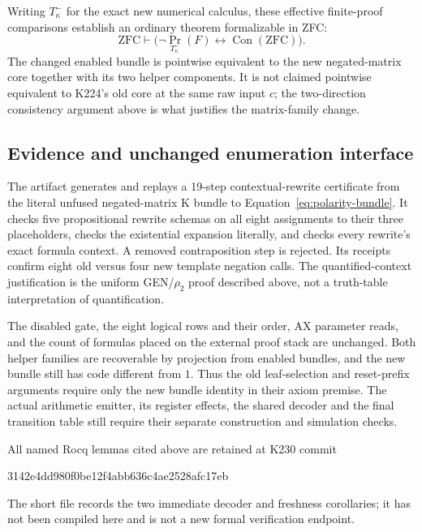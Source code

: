 Writing $T^-_\kappa$ for the exact new numerical calculus, these
effective finite-proof comparisons establish an ordinary theorem
formalizable in ZFC:
\[
 \mathrm{ZFC}\vdash
 \bigl(\neg\operatorname{Pr}_{T^-_\kappa}(F)
       \leftrightarrow\operatorname{Con}(\mathrm{ZFC})\bigr).
\]
The changed enabled bundle is pointwise equivalent to the new
negated-matrix core together with its two helper components.  It is not
claimed pointwise equivalent to K224's old core at the same raw input
$c$; the two-direction consistency argument above is what justifies the
matrix-family change.

\subsection{Evidence and unchanged enumeration interface}

The artifact  generates and replays a
19-step contextual-rewrite certificate from the literal unfused
negated-matrix K bundle to Equation~\eqref{eq:polarity-bundle}.
It checks five propositional rewrite schemas on all eight assignments
to their three placeholders, checks the existential expansion literally,
and checks every rewrite's exact formula context.  A removed
contraposition step is rejected.  Its receipts confirm eight old versus
four new template negation calls.  The quantified-context justification
is the uniform GEN/$\rho_2$ proof described above, not a truth-table
interpretation of quantification.

The disabled gate, the eight logical rows and their order, AX parameter
reads, and the count of formulas placed on the external proof stack are
unchanged.  Both helper families are recoverable by projection from
enabled bundles, and the new bundle still has code different from $1$.
Thus the old leaf-selection and reset-prefix arguments require only the
new bundle identity in their axiom premise.  The actual arithmetic
emitter, its register effects, the shared decoder and the final transition
table still require their separate construction and simulation checks.

All named Rocq lemmas cited above are retained at K230 commit
\begin{center}\small\ttfamily
3142e4dd980f0be12f4abb636c4ae2528afc17eb
\end{center}
The short file
 records the two immediate decoder
and freshness corollaries; it has not been compiled here and is not a
new formal verification endpoint.
